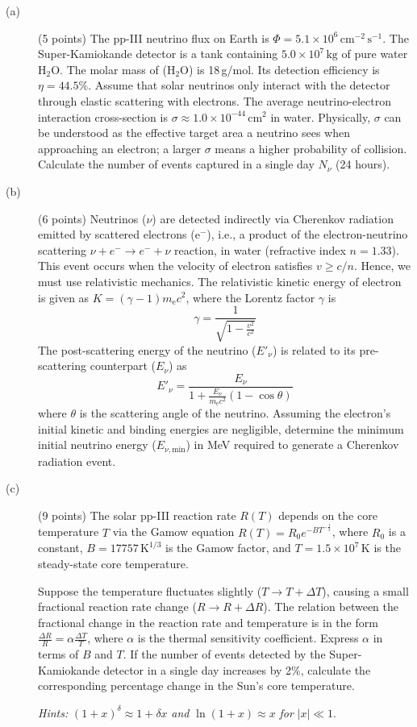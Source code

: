 \begin{description}
\item[(a)] (5 points) The pp-III neutrino flux on Earth is
  $\Phi = 5.1 \times 10^6\,\mathrm{cm^{-2}\,s^{-1}}$. The Super-Kamiokande
  detector is a tank containing $5.0 \times 10^7\,\mathrm{kg}$ of pure water
  $\mathrm{H_2O}$. The molar mass of ($\mathrm{H_2O}$) is 18\,g/mol. Its
  detection efficiency is $\eta = 44.5\%$. Assume that solar neutrinos only
  interact with the detector through elastic scattering with electrons. The
  average neutrino-electron interaction cross-section is
  $\sigma \approx 1.0 \times 10^{-44}\,\mathrm{cm^2}$ in water. Physically,
  $\sigma$ can be understood as the effective target area a neutrino sees
  when approaching an electron; a larger $\sigma$ means a higher probability
  of collision. Calculate the number of events captured in a single day
  $N_\nu$ (24 hours).
\item[(b)] (6 points) Neutrinos ($\nu$) are detected indirectly via Cherenkov
  radiation emitted by scattered electrons ($\mathrm{e}^-$), i.e., a product
  of the electron-neutrino scattering $\nu + e^- \to e^- + \nu$ reaction, in
  water (refractive index $n = 1.33$). This event occurs when the velocity of
  electron satisfies $v \ge c/n$. Hence, we must use relativistic mechanics.
  The relativistic kinetic energy of electron is given as
  $K = (\gamma - 1)m_{\mathrm{e}}c^2$, where the Lorentz factor $\gamma$ is
  \[ \gamma = \frac{1}{\sqrt{1 - \frac{v^2}{c^2}}} \]
  The post-scattering energy of the neutrino ($E'_\nu$) is related to its
  pre-scattering counterpart ($E_\nu$) as
  \[ E'_\nu = \frac{E_\nu}{1 + \frac{E_\nu}{m_{\mathrm{e}}c^2}(1 - \cos\theta)} \]
  where $\theta$ is the scattering angle of the neutrino. Assuming the
  electron's initial kinetic and binding energies are negligible, determine
  the minimum initial neutrino energy ($E_{\nu,\mathrm{min}}$) in MeV required
  to generate a Cherenkov radiation event.
\item[(c)] (9 points) The solar pp-III reaction rate $R(T)$ depends on the
  core temperature $T$ via the Gamow equation
  $R(T) = R_0 e^{-BT^{-\frac{1}{3}}}$, where $R_0$ is a constant,
  $B = 17757\,\mathrm{K}^{1/3}$ is the Gamow factor, and
  $T = 1.5 \times 10^7\,\mathrm{K}$ is the steady-state core temperature.

  Suppose the temperature fluctuates slightly ($T \to T + \Delta T$), causing
  a small fractional reaction rate change ($R \to R + \Delta R$). The relation
  between the fractional change in the reaction rate and temperature is in
  the form $\frac{\Delta R}{R} = \alpha\frac{\Delta T}{T}$, where $\alpha$ is
  the thermal sensitivity coefficient. Express $\alpha$ in terms of $B$ and
  $T$. If the number of events detected by the Super-Kamiokande detector in a
  single day increases by 2\%, calculate the corresponding percentage change
  in the Sun's core temperature.

  \textit{Hints:} $(1 + x)^\delta \approx 1 + \delta x$ \textit{and}
  $\ln(1 + x) \approx x$ \textit{for} $|x| \ll 1$.
\end{description}

